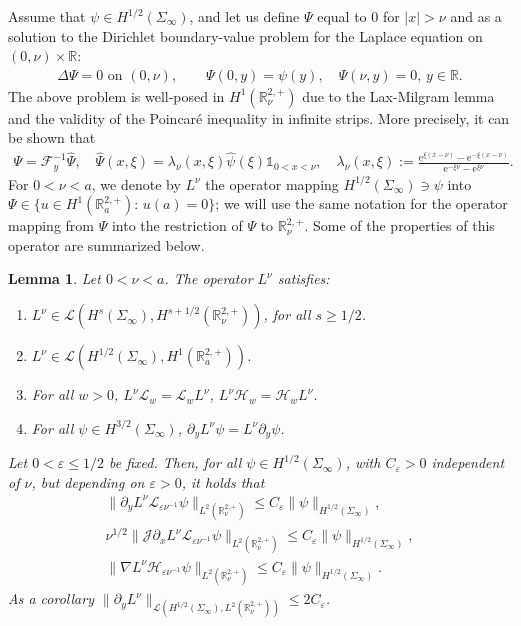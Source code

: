 \documentclass[report]{elsarticle}
\newtheorem{lemma}[theorem]{Lemma}
\numberwithin{theorem}{section}
\newcommand{\re}{\varepsilon}
\begin{document}
Assume that $\psi\in H^{1/2}(\Sigma_{\infty})$, and let us define $\Psi$ equal to $0$ for $|x|>\nu$ and as a solution to the Dirichlet boundary-value problem for the Laplace equation on $(0,\nu)\times \mathbb{R}$:
\begin{align*}
	\Delta \Psi=0 \text{ on }(0, \nu), \qquad \Psi(0,y)=\psi(y), \quad \Psi(\nu, y)=0, \, y\in \mathbb{R}. 
\end{align*}
The above problem is well-posed in $H^1(\mathbb{R}^{2,+}_{\nu})$ due to the Lax-Milgram lemma and the validity of the Poincar\'e inequality in infinite strips. More precisely, it can be shown that
\begin{align*}
	\Psi=\mathcal{F}_y^{-1}\hat{\Psi}, \quad \hat{\Psi}(x,\xi)=\lambda_{\nu}(x,\xi)\hat{\psi}(\xi)\mathbb{1}_{0<x<\nu}, \quad \lambda_{\nu}(x,\xi):=\frac{\mathrm{e}^{\xi (x-\nu)}-\mathrm{e}^{-\xi(x-\nu)}}{\mathrm{e}^{-\xi\nu}-\mathrm{e}^{\xi\nu}}.
\end{align*}
For $0<\nu<a$, we denote by $L^{\nu}$ the operator mapping $H^{1/2}(\Sigma_{\infty})\ni\psi$ into $\Psi\in \{u\in H^1(\mathbb{R}^{2,+}_{a}): \, u(a)=0\}$; we will use the same notation for the operator mapping from $\Psi$ into the restriction of $\Psi$ to $\mathbb{R}^{2,+}_{\nu}$. Some of the properties of this operator are summarized below. 
\begin{lemma}
	Let $0<\nu<a$. The operator $L^{\nu}$ satisfies: 
	\begin{enumerate}
		\item  $L^{\nu}\in \mathcal{L}({H}^{s}(\Sigma_{\infty}), H^{s+1/2}(\mathbb{R}^{2,+}_{\nu}))$, for all $s\geq 1/2$. 
		\item $L^{\nu}\in \mathcal{L}(H^{1/2}(\Sigma_{\infty}), H^1(\mathbb{R}^{2,+}_a))$.
		\item For all $w>0$, $L^{\nu}\mathcal{L}_{w}= \boldsymbol{\mathcal{L}}_{w}L^{\nu}$, $L^{\nu}\mathcal{H}_{w}= \boldsymbol{\mathcal{H}}_{w}L^{\nu}$.
		\item For all $\psi\in H^{3/2}(\Sigma_{\infty})$, $\partial_y L^{\nu}\psi=L^{\nu}\partial_y \psi$. 
	\end{enumerate}  
	Let $0<\re\leq 1/2$ be fixed. Then,  for all $\psi\in H^{1/2}(\Sigma_{\infty})$, with $C_{\re}>0$ independent of $\nu$, but depending on $\re>0$, it holds that
	\begin{align}
		\label{eq:psibound_start0}
		\|\partial_yL^{\nu}\mathcal{L}_{\re\nu^{-1}}\psi\|_{L^2(\mathbb{R}^{2,+}_{\nu})}\leq C_{\re}\|\psi\|_{H^{1/2}(\Sigma_{\infty})},\\
		\label{eq:psibound_start_dx}
		\nu^{1/2}\|\mathcal{J}\partial_x L^{\nu}\mathcal{L}_{\re\nu^{-1}}\psi\|_{L^2(\mathbb{R}^{2,+}_{\nu})}\leq C_{\re}\|\psi\|_{H^{1/2}(\Sigma_{\infty})},\\
		\label{eq:partialy_psibound}
		\|\nabla L^{\nu}\mathcal{H}_{\re\nu^{-1}}\psi\|_{L^2(\mathbb{R}^{2,+}_{\nu})}\leq C_{\re}\|\psi\|_{H^{1/2}(\Sigma_{\infty})}.
	\end{align}
As a corollary $\|\partial_y L^{\nu}\|_{\mathcal{L}(H^{1/2}(\Sigma_{\infty}), L^2(\mathbb{R}^{2,+}_{\nu}))}\leq 2C_{\re}$. 
\end{lemma}
\end{document}
